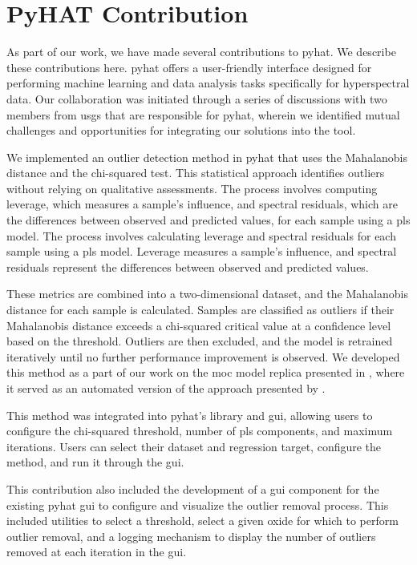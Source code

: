 \section{PyHAT Contribution}\label{sec:pyhat_contribution}
As part of our work, we have made several contributions to \gls{pyhat}.
We describe these contributions here.
\gls{pyhat} offers a user-friendly interface designed for performing machine learning and data analysis tasks specifically for hyperspectral data.
Our collaboration was initiated through a series of discussions with two members from \gls{usgs} that are responsible for \gls{pyhat}, wherein we identified mutual challenges and opportunities for integrating our solutions into the tool.

We implemented an outlier detection method in \gls{pyhat} that uses the Mahalanobis distance and the chi-squared test.
This statistical approach identifies outliers without relying on qualitative assessments.
The process involves computing leverage, which measures a sample's influence, and spectral residuals, which are the differences between observed and predicted values, for each sample using a \gls{pls} model.
The process involves calculating leverage and spectral residuals for each sample using a \gls{pls} model.
Leverage measures a sample's influence, and spectral residuals represent the differences between observed and predicted values.

These metrics are combined into a two-dimensional dataset, and the Mahalanobis distance for each sample is calculated.
Samples are classified as outliers if their Mahalanobis distance exceeds a chi-squared critical value at a confidence level based on the threshold.
Outliers are then excluded, and the model is retrained iteratively until no further performance improvement is observed.
We developed this method as a part of our work on the \gls{moc} model replica presented in \citet{p9_paper}, where it served as an automated version of the approach presented by \citet{andersonImprovedAccuracyQuantitative2017}.

This method was integrated into \gls{pyhat}'s library and \gls{gui}, allowing users to configure the chi-squared threshold, number of \gls{pls} components, and maximum iterations.
Users can select their dataset and regression target, configure the method, and run it through the \gls{gui}.

This contribution also included the development of a \gls{gui} component for the existing \gls{pyhat} \gls{gui} to configure and visualize the outlier removal process.
This included utilities to select a threshold, select a given oxide for which to perform outlier removal, and a logging mechanism to display the number of outliers removed at each iteration in the \gls{gui}.


